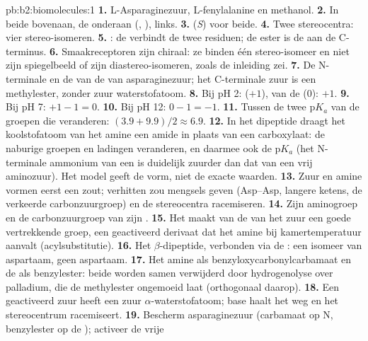 \begin{solution}{pb:b2:biomolecules:1}
\textbf{1.} L-Asparaginezuur, L-fenylalanine en methanol.
\textbf{2.} In beide  bovenaan, de  onderaan (, ), 
links.
\textbf{3.} (\textit{S}) voor beide.
\textbf{4.} Twee stereocentra: vier stereo-isomeren.
\textbf{5.} : de  verbindt de twee
residuen; de ester is de  aan de C-terminus.
\textbf{6.} Smaakreceptoren zijn chiraal: ze binden één stereo-isomeer en niet zijn spiegelbeeld of zijn
diastereo-isomeren, zoals de inleiding zei.
\textbf{7.} De N-terminale  en de  van de  van asparaginezuur; het C-terminale zuur
is een methylester, zonder zuur waterstofatoom.
\textbf{8.} Bij pH 2:  ($+1$),  van de  (0): $+1$.
\textbf{9.} Bij pH 7: $+1 - 1 = 0$.
\textbf{10.} Bij pH 12: $0 - 1 = -1$.
\textbf{11.} Tussen de twee $\mathrm pK_a$ van de groepen die veranderen: $(3.9 + 9.9)/2 \approx 6.9$.
\textbf{12.} In het dipeptide draagt het koolstofatoom van het amine een amide in plaats van een carboxylaat: de
naburige groepen en ladingen veranderen, en daarmee ook de $\mathrm pK_a$ (het N-terminale ammonium van een
 is duidelijk zuurder dan dat van een vrij aminozuur). Het model geeft de vorm, niet de
exacte waarden.
\textbf{13.} Zuur en amine vormen eerst een zout; verhitten zou mengsels geven (Asp--Asp, langere ketens,
de verkeerde carbonzuurgroep) en de stereocentra racemiseren.
\textbf{14.} Zijn aminogroep en de carbonzuurgroep van zijn .
\textbf{15.} Het maakt van de  van het zuur een goede vertrekkende groep, een geactiveerd derivaat dat het
amine bij kamertemperatuur aanvalt (acylsubstitutie).
\textbf{16.} Het $\beta$-dipeptide, verbonden via de : een isomeer van aspartaam, geen aspartaam.
\textbf{17.} Het amine als benzyloxycarbonylcarbamaat en de  als benzylester: beide worden
samen verwijderd door hydrogenolyse over palladium, die de methylester ongemoeid laat (orthogonaal
daarop).
\textbf{18.} Een geactiveerd zuur heeft een zuur $\alpha$-waterstofatoom; base haalt het weg en het stereocentrum
racemiseert.
\textbf{19.} Bescherm asparaginezuur (carbamaat op N, benzylester op de ); activeer de vrije

\end{solution}
